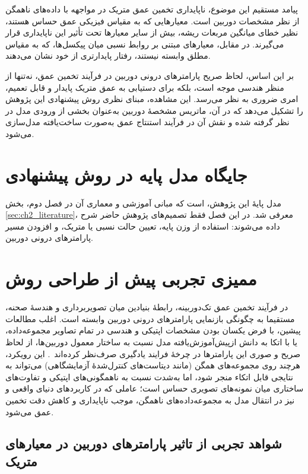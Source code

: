 پیامد مستقیم این موضوع، ناپایداری تخمین عمق متریک در مواجهه با داده‌های ناهمگن از نظر مشخصات دوربین است. معیارهایی که به مقیاس فیزیکی عمق حساس هستند، نظیر خطای میانگین مربعات ریشه، بیش از سایر معیارها تحت تأثیر این ناپایداری قرار می‌گیرند. در مقابل، معیارهای مبتنی بر روابط نسبی میان پیکسل‌ها، که به مقیاس مطلق وابسته نیستند، رفتار پایدارتری از خود نشان می‌دهند.

بر این اساس، لحاظ صریح پارامترهای درونی دوربین در فرآیند تخمین عمق، نه‌تنها از منظر هندسی موجه است، بلکه برای دستیابی به عمق متریک پایدار و قابل تعمیم، امری ضروری به نظر می‌رسد. این مشاهده، مبنای نظری روش پیشنهادی این پژوهش را تشکیل می‌دهد که در آن، ماتریس مشخصهٔ دوربین به‌عنوان بخشی از ورودی مدل در نظر گرفته شده و نقش آن در فرآیند استنتاج عمق به‌صورت ساخت‌یافته مدل‌سازی می‌شود.

\section{جایگاه مدل پایه در روش پیشنهادی}

مدل پایهٔ این پژوهش،  است که مبانی آموزشی و معماری
 آن در فصل دوم، بخش \ref{sec:ch2_literature}، معرفی شد. در
این فصل فقط تصمیم‌های پژوهش حاضر شرح داده می‌شوند: استفاده از وزن پایه، تعیین
حالت نسبی یا متریک، و افزودن مسیر پارامترهای درونی دوربین.

\section{ممیزی تجربی پیش از طراحی روش}

در فرآیند تخمین عمق تک‌دوربینه، رابطهٔ بنیادین میان تصویربرداری و هندسهٔ صحنه، مستقیما به چگونگی بازنمایی پارامترهای درونی دوربین وابسته است. اغلب مطالعات پیشین، با فرض یکسان بودن مشخصات اپتیکی و هندسی در تمام تصاویر مجموعه‌داده، یا با اتکا به دانش ازپیش‌آموزش‌یافته مدل نسبت به ساختار معمول دوربین‌ها، از لحاظ صریح و صوری این پارامترها در چرخهٔ فرایند یادگیری صرف‌نظر کرده‌اند~\cite{Godard2017Unsupervised,Zhou2017Unsupervised,DepthAnythingV2}. این رویکرد، هرچند روی مجموعه‌های همگن (مانند دیتاست‌های کنترل‌شدهٔ آزمایشگاهی) می‌تواند به نتایجی قابل اتکاء منجر شود، اما به‌شدت نسبت به ناهمگونی‌های اپتیکی و تفاوت‌های ساختاری میان نمونه‌های تصویری حساس است؛ عاملی که در کاربردهای دنیای واقعی و نیز در انتقال مدل به مجموعه‌داده‌های ناهمگن، موجب ناپایداری و کاهش دقت تخمین عمق می‌شود.

\subsection{شواهد تجربی از تاثیر پارامترهای دوربین در معیارهای متریک}

